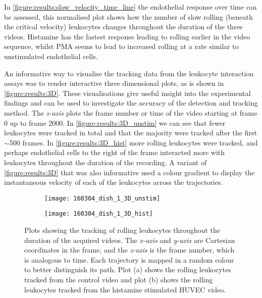 In \autoref{figure:results:slow_velocity_time_line} the endothelial response over time can be assessed, this normalised plot shows how the number of slow rolling (beneath the critical velocity) leukocytes changes throughout the duration of the three videos. Histamine has the fastest response leading to rolling earlier in the video sequence, whilst PMA seems to lead to increased rolling at a rate similar to unstimulated endothelial cells.

An informative way to visualise the tracking data from the leukocyte interaction assays was to render interactive three dimensional plots, as is shown in \autoref{figure:results:3D}. These visualisations give useful insight into the experimental findings and can be used to investigate the accuracy of the detection and tracking method. The \emph{z-axis} plots the frame number or time of the video starting at frame 0 up to frame 2000. In \autoref{figure:results:3D_unstim} we can see that fewer leukocytes were tracked in total and that the majority were tracked after the first $\sim$500 frames. In \autoref{figure:results:3D_hist} more rolling leukocytes were tracked, and perhaps endothelial cells to the right of the frame interacted more with leukocytes throughout the duration of the recording. A variant of \autoref{figure:results:3D} that was also informative used a colour gradient to display the instantaneous velocity of each of the leukocytes across the trajectories.

\begin{figure}[htbp]\centering
	\begin{subfigure}[b]{0.49\linewidth}
		\centering
		\texttt{[image: 160304\_dish\_1\_3D\_unstim]}
		\caption{}
		\label{figure:results:3D_unstim}
		\vspace{1ex}
	\end{subfigure}
	\begin{subfigure}[b]{0.49\linewidth}
		\centering
		\texttt{[image: 160304\_dish\_1\_3D\_hist]}
		\caption{}
		\label{figure:results:3D_hist}
		\vspace{1ex}
	\end{subfigure}
\caption[3D plots of rolling leukocyte trajectories]{Plots showing the tracking of rolling leukocytes throughout the duration of the acquired videos. The \emph{x-axis} and \emph{y-axis} are Cartesian coordinates in the frame, and the \emph{z-axis} is the frame number, which is analogous to time. Each trajectory is mapped in a random colour to better distinguish its path. Plot (a) shows the rolling leukocytes tracked from the control video and plot (b) shows the rolling leukocytes tracked from the histamine stimulated HUVEC video.}
\label{figure:results:3D}
\end{figure}

